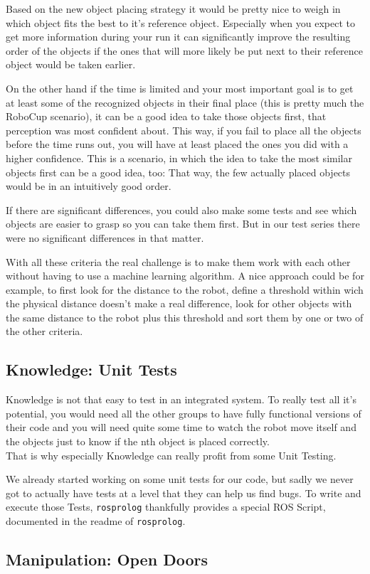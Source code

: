 \documentclass[main.tex]{subfiles}
\begin{document}
	  	Based on the new object placing strategy it would be pretty nice to weigh in which object fits the best to it's reference object. Especially when you expect to get more information during your run it can significantly improve the resulting order of the objects if the ones that will more likely be put next to their reference object would be taken earlier.
	  	
		On the other hand if the time is limited and your most important goal is to get at least some of the recognized objects in their final place (this is pretty much the RoboCup scenario), it can be a good idea to take those objects first, that perception was most confident about. This way, if you fail to place all the objects before the time runs out, you will have at least placed the ones you did with a higher confidence. This is a scenario, in which the idea to take the most similar objects first can be a good idea, too: That way, the few actually placed objects would be in an intuitively good order.
		
		If there are significant differences, you could also make some tests and see which objects are easier to grasp so you can take them first. But in our test series there were no significant differences in that matter. 
		
		With all these criteria the real challenge is to make them work with each other without having to use a machine learning algorithm. A nice approach could be for example, to first look for the distance to the robot, define a threshold within wich the physical distance doesn't make a real difference, look for other objects with the same distance to the robot plus this threshold and sort them by one or two of the other criteria. 
		
		\subsection{Knowledge: Unit Tests}
		Knowledge is not that easy to test in an integrated system. To really test all it's potential, you would need all the other groups to have fully functional versions of their code and you will need quite some time to watch the robot move itself and the objects just to know if the nth object is placed correctly.\\
		That is why especially Knowledge can really profit from some Unit Testing.
		
		We already started working on some unit tests for our code, but sadly we never got to actually have tests at a level that they can help us find bugs. To write and execute those Tests, \texttt{rosprolog} thankfully provides a special ROS Script, documented in the readme of \texttt{rosprolog}.


		
		\subsection{Manipulation: Open Doors}
		
		
		
	\endgroup
\end{document}
